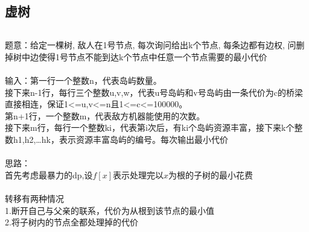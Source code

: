 \documentclass[twoside]{article}
\begin{document}
\subsection{虚树}
\begin{lstlisting}
\end{lstlisting}
题意：给定一棵树, 敌人在1号节点, 每次询问给出k个节点, 每条边都有边权, 问删掉树中边使得1号节点不能到达k个节点中任意一个节点需要的最小代价\\
\\
输入：第一行一个整数n，代表岛屿数量。\\
接下来n-1行，每行三个整数u,v,w，代表u号岛屿和v号岛屿由一条代价为c的桥梁直接相连，保证1<=u,v<=n且1<=c<=100000。\\
第n+1行，一个整数m，代表敌方机器能使用的次数。\\
接下来m行，每行一个整数ki，代表第i次后，有ki个岛屿资源丰富，接下来k个整数h1,h2,…hk，表示资源丰富岛屿的编号。每次输出最小代价\\
\\
思路：\\
首先考虑最暴力的dp,设$f[x]$表示处理完以$x$为根的子树的最小花费\\
\\
转移有两种情况\\
1.断开自己与父亲的联系，代价为从根到该节点的最小值\\
2.将子树内的节点全都处理掉的代价\\
\end{document}
